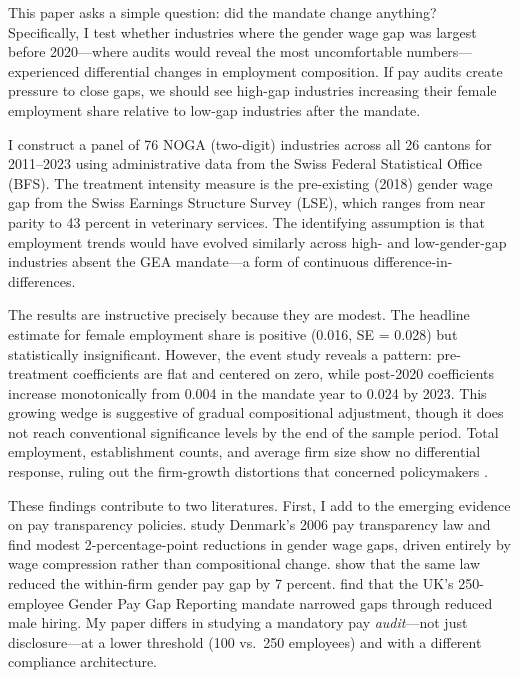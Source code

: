 \documentclass[12pt]{article}
\begin{document}
This paper asks a simple question: did the mandate change anything? Specifically, I test whether industries where the gender wage gap was largest before 2020---where audits would reveal the most uncomfortable numbers---experienced differential changes in employment composition. If pay audits create pressure to close gaps, we should see high-gap industries increasing their female employment share relative to low-gap industries after the mandate.

I construct a panel of 76 NOGA (two-digit) industries across all 26 cantons for 2011--2023 using administrative data from the Swiss Federal Statistical Office (BFS). The treatment intensity measure is the pre-existing (2018) gender wage gap from the Swiss Earnings Structure Survey (LSE), which ranges from near parity to 43 percent in veterinary services. The identifying assumption is that employment trends would have evolved similarly across high- and low-gender-gap industries absent the GEA mandate---a form of continuous difference-in-differences.

The results are instructive precisely because they are modest. The headline estimate for female employment share is positive (0.016, SE = 0.028) but statistically insignificant. However, the event study reveals a pattern: pre-treatment coefficients are flat and centered on zero, while post-2020 coefficients increase monotonically from 0.004 in the mandate year to 0.024 by 2023. This growing wedge is suggestive of gradual compositional adjustment, though it does not reach conventional significance levels by the end of the sample period. Total employment, establishment counts, and average firm size show no differential response, ruling out the firm-growth distortions that concerned policymakers \citep{garicano2016firm}.

These findings contribute to two literatures. First, I add to the emerging evidence on pay transparency policies. \citet{baker2023pay} study Denmark's 2006 pay transparency law and find modest 2-percentage-point reductions in gender wage gaps, driven entirely by wage compression rather than compositional change. \citet{bennedsen2022firms} show that the same law reduced the within-firm gender pay gap by 7 percent. \citet{duchini2020pay} find that the UK's 250-employee Gender Pay Gap Reporting mandate narrowed gaps through reduced male hiring. My paper differs in studying a mandatory pay \textit{audit}---not just disclosure---at a lower threshold (100 vs.\ 250 employees) and with a different compliance architecture.
\end{document}
